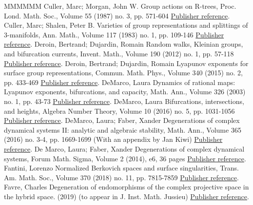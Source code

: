 \begin{thebibliography}{MMMMMM}
 Culler, Marc; Morgan, John W. Group actions on R-trees, Proc. Lond. Math. Soc., Volume 55 (1987) no. 3, pp. 571-604 \href{https://ahl.centre-mersenne.org/item/AHL_2019__2__515_0/#culler-morgan}{Publisher reference}.
 Culler, Marc; Shalen, Peter B. Varieties of group representations and splittings of 3-manifolds, Ann. Math., Volume 117 (1983) no. 1, pp. 109-146 \href{https://ahl.centre-mersenne.org/item/AHL_2019__2__515_0/#culler-shalen}{Publisher reference}.
 Deroin, Bertrand; Dujardin, Romain Random walks, Kleinian groups, and bifurcation currents, Invent. Math., Volume 190 (2012) no. 1, pp. 57-118 \href{https://ahl.centre-mersenne.org/item/AHL_2019__2__515_0/#kleinbif}{Publisher reference}.
 Deroin, Bertrand; Dujardin, Romain Lyapunov exponents for surface group representations, Commun. Math. Phys., Volume 340 (2015) no. 2, pp. 433-469 \href{https://ahl.centre-mersenne.org/item/AHL_2019__2__515_0/#bers1}{Publisher reference}.
 DeMarco, Laura Dynamics of rational maps: Lyapunov exponents, bifurcations, and capacity, Math. Ann., Volume 326 (2003) no. 1, pp. 43-73 \href{https://ahl.centre-mersenne.org/item/AHL_2019__2__515_0/#demarco03}{Publisher reference}.
 DeMarco, Laura Bifurcations, intersections, and heights, Algebra Number Theory, Volume 10 (2016) no. 5, pp. 1031-1056 \href{https://ahl.centre-mersenne.org/item/AHL_2019__2__515_0/#demarco16}{Publisher reference}.
 DeMarco, Laura; Faber, Xander Degenerations of complex dynamical systems II: analytic and algebraic stability, Math. Ann., Volume 365 (2016) no. 3-4, pp. 1669-1699 (With an appendix by Jan Kiwi) \href{https://ahl.centre-mersenne.org/item/AHL_2019__2__515_0/#demarco-faber-2}{Publisher reference}.
 De Marco, Laura; Faber, Xander Degenerations of complex dynamical systems, Forum Math. Sigma, Volume 2 (2014), e6, 36 pages \href{https://ahl.centre-mersenne.org/item/AHL_2019__2__515_0/#demarco-faber}{Publisher reference}.
 Fantini, Lorenzo Normalized Berkovich spaces and surface singularities, Trans. Am. Math. Soc., Volume 370 (2018) no. 11, pp. 7815-7859 \href{https://ahl.centre-mersenne.org/item/AHL_2019__2__515_0/#NL}{Publisher reference}.
 Favre, Charles Degeneration of endomorphisms of the complex projective space in the hybrid space. (2019) (to appear in J. Inst. Math. Jussieu) \href{https://ahl.centre-mersenne.org/item/AHL_2019__2__515_0/#degeneration}{Publisher reference}.

\end{thebibliography}
